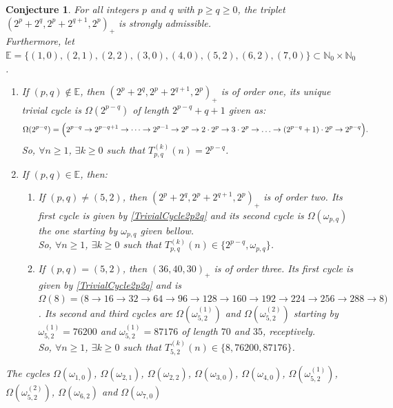 \documentclass[11pt,a4paper]{article}
\newtheorem{conjecture}{Conjecture}[section]
\begin{document}
\begin{conjecture}\label{MainConjecture2p2q}
	For all   integers $p$ and $q$ with $p\geq q\geq 0$, the triplet
	$(2^p+2^q, 2^p+2^{q+1}, 2^p)_+$	  
	is  strongly  admissible.\\
	Furthermore, let  $\mathbb{E}=\{(1,0),(2,1),(2,2),(3,0),(4,0),(5,2),(6,2),(7,0)\}\subset \mathbb{N}_0\times  \mathbb{N}_0$.  
	\begin{enumerate} 
		\item If $(p,q)\not\in \mathbb{E}$, then $(2^p+2^q, 2^p+2^{q+1}, 2^p)_+$	 is
		of order one, its unique  trivial cycle is $\Omega(2^{p-q})$ of length $2^{p-q}+q+1$ given as:
		\begin{equation}\label{TrivialCycle2p2q}
			\Omega(2^{p-q})=\Bigl(2^{p-q}\rightarrow  2^{p-q+1}\rightarrow
			\cdots  \rightarrow2^{p-1}\rightarrow 
			2^{p}\rightarrow
			2\cdot2^{p}\rightarrow
			3\cdot2^{p}\rightarrow
			\ldots\rightarrow (2^{p-q}+1)\cdot2^{p}\rightarrow 2^{p-q}\Bigr).
		\end{equation}
		So, $\forall n\geq 1$,  $\exists k\geq 0$ such that $T_{p,q}^{(k)}(n)=2^{p-q}$.
		\item  If $(p,q)\in \mathbb{E}$, then:
		\begin{enumerate}
			\item  If $(p,q)\not=(5,2)$,  then 
			$(2^p+2^q, 2^p+2^{q+1}, 2^p)_+$   is  of order two.     Its first  cycle is  given by 	\eqref{TrivialCycle2p2q} and its second  cycle is  $\Omega(\omega_{p,q})$ the one starting  by $\omega_{p,q}$ given bellow.\\ 
			So,  $\forall n\geq 1$, $\exists k\geq 0$ such that $T^{(k)}_{p,q}(n)\in \{2^{p-q},\omega_{p,q}\}$. 
			\vspace{0.5cm}
			\item  If $(p,q)=(5,2)$,  then $(36,40,30)_+$ is of order three.  Its first  cycle is  given by 	\eqref{TrivialCycle2p2q}  and is $\Omega(8)=\bigl(8\rightarrow16\rightarrow32\rightarrow64\rightarrow96\rightarrow128\rightarrow160\rightarrow192\rightarrow224\rightarrow256\rightarrow288\rightarrow8\bigr)$. Its second and third cycles are
			$\Omega(\omega^{(1)}_{5,2})$ and $\Omega(\omega^{(2)}_{5,2})$ starting  by $\omega^{(1)}_{5,2}=76200$  and  $\omega^{(1)}_{5,2}=87176$  of length $70$ and  $35$, receptively.\\
			So, $\forall n\geq 1$,  $\exists k\geq 0$ such that 
			$T_{5,2}^{(k)}(n)\in\{8,76200,87176\}$.
		\end{enumerate}
	\end{enumerate}	
The cycles  $\Omega(\omega_{1,0})$, $\Omega(\omega_{2,1})$, $\Omega(\omega_{2,2})$, $\Omega(\omega_{3,0})$, $\Omega(\omega_{4,0})$, $\Omega(\omega^{(1)}_{5,2})$, $\Omega(\omega^{(2)}_{5,2})$, $\Omega(\omega_{6,2})$ and $\Omega(\omega_{7,0})$

\end{conjecture}
\end{document}
